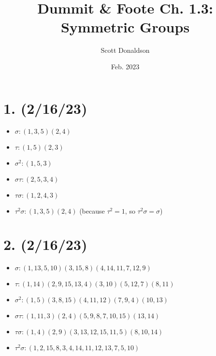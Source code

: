 \documentclass{article}
\title{Dummit \& Foote Ch. 1.3: Symmetric Groups}
\author{Scott Donaldson}
\date{Feb. 2023}
\begin{document}
\maketitle

\section*{1. (2/16/23)}

\begin{itemize}
    \item $\sigma: (1, 3, 5)(2, 4)$
    \item $\tau: (1, 5)(2, 3)$
    \item $\sigma^2: (1, 5, 3)$
    \item $\sigma \tau: (2, 5, 3, 4)$
    \item $\tau \sigma: (1, 2, 4, 3)$
    \item $\tau^2 \sigma: (1, 3, 5)(2, 4)$ (because $\tau^2 = 1$, so $\tau^2 \sigma = \sigma$)
\end{itemize}

\section*{2. (2/16/23)}

\begin{itemize}
    \item $\sigma: (1,13,5,10)(3,15,8)(4,14,11,7,12,9)$
    \item $\tau: (1, 14)(2, 9, 15, 13, 4)(3, 10)(5, 12, 7)(8, 11)$
    \item $\sigma^2: (1, 5)(3, 8, 15)(4, 11, 12)(7, 9, 4)(10, 13)$
    \item $\sigma \tau: (1, 11, 3)(2, 4)(5, 9, 8, 7, 10, 15)(13, 14)$
    \item $\tau \sigma: (1, 4)(2, 9)(3, 13, 12, 15, 11, 5)(8, 10, 14)$
    \item $\tau^2 \sigma: (1, 2, 15, 8, 3, 4, 14, 11, 12, 13, 7, 5, 10)$
\end{itemize}
\end{document}
